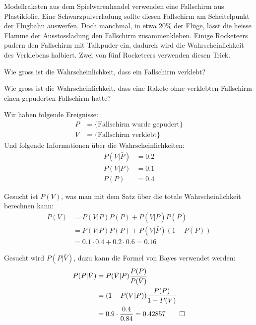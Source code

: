 Modellraketen aus dem Spielwarenhandel verwenden eine Fallschirm aus
Plastikfolie. Eine Schwarzpulverladung sollte diesen Fallschirm am
Scheitelpunkt der Flugbahn auswerfen. Doch manchmal, in etwa 20\%
der Flüge, lässt die heisse
Flamme der Ausstossladung den Fallschirm zusammenkleben. Einige
Rocketeers pudern den Fallschirm mit Talkpuder ein, dadurch wird
die Wahrscheinlichkeit des Verklebens halbiert.
Zwei von fünf Rocketeers verwenden diesen Trick.
\begin{teilaufgaben}
\item Wie gross ist die Wahrscheinlichkeit, dass ein Fallschirm
verklebt?
\item Wie gross ist die Wahrscheinlichkeit, dass eine Rakete
ohne verklebten Fallschirm einen gepuderten Fallschirm hatte?
\end{teilaufgaben}


\begin{loesung}
Wir haben folgende Ereignisse:
\begin{align*}
P&=\{\text{Fallschirm wurde gepudert}\}\\
V&=\{\text{Fallschirm verklebt}\}
\end{align*}
Und folgende Informationen über die Wahrscheinlichkeiten:
\begin{align*}
P(V|\bar P)&=0.2\\
P(V|P)&=0.1\\
P(P)&=0.4
\end{align*}
\begin{teilaufgaben}
\item Gesucht ist $P(V)$, was man mit dem Satz über die totale
Wahrscheinlichkeit berechnen kann:
\begin{align*}
P(V)&=P(V|P)P(P)+P(V|\bar P)P(\bar P)\\
&=P(V|P)P(P)+P(V|\bar P)(1-P(P))\\
&=0.1\cdot 0.4+0.2\cdot 0.6=0.16
\end{align*}
\item Gesucht wird $P(P|\bar V)$, dazu kann die Formel von Bayes verwendet
werden:
\begin{align*}
P(P|\bar V)
&=
P(\bar V |P)\frac{P(P)}{P(\bar V)}
\\
&=(1-P(V|P))\frac{P(P)}{1-P(V)}\\
&=
0.9 \cdot\frac{0.4}{0.84}=0.42857
\qedhere
\end{align*}
\end{teilaufgaben}
\end{loesung}


